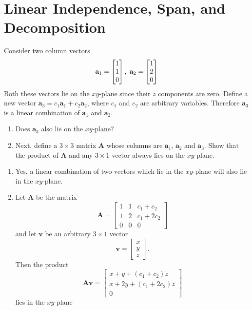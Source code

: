 

\section{Linear Independence, Span, and Decomposition}

\begin{prob}
Consider two column vectors
\begin{align}
\mathbf{a}_1 = \begin{bmatrix} 1 \\ 1 \\ 0 \end{bmatrix}, \;\mathbf{a}_2 = \begin{bmatrix} 1 \\ 2 \\ 0 \end{bmatrix}
\end{align}
Both these vectors lie on the $xy$-plane since their $z$ components are zero. Define a new vector $\mathbf{a}_3 = c_1\mathbf{a}_1 + c_2\mathbf{a}_2$, where $c_1$ and $c_2$ are arbitrary variables. Therefore $\mathbf{a}_3$ is a linear combination of $\mathbf{a}_1$ and $\mathbf{a}_2$.
\begin{enumerate}
\item Does $\mathbf{a}_3$ also lie on the $xy$-plane?
\item Next, define a $3\times 3$ matrix $\mathbf{A}$ whose columns are $\mathbf{a}_1$, $\mathbf{a}_2$ and $\mathbf{a}_3$. Show that the product of $\mathbf{A}$ and any $3\times 1$ vector always lies on the $xy$-plane.
\end{enumerate}
\end{prob}
\begin{sol}
	\begin{enumerate}
		\item Yes, a linear combination of two vectors which lie in the $xy$-plane will also lie in the $xy$-plane.
		\item Let $\mathbf{A}$ be the matrix
		$$\mathbf{A} = \begin{bmatrix} 1 & 1 & c_1+c_2 \\ 1 & 2 & c_1+2c_2 \\ 0 & 0 & 0 \end{bmatrix}$$
		and let $\mathbf{v}$ be an arbitrary $3 \times 1$ vector
		$$\mathbf{v} = \begin{bmatrix} x \\ y \\ z \end{bmatrix}.$$
		Then the product
		$$\mathbf{Av} = \begin{bmatrix} x + y + (c_1+c_2)z \\ x + 2y + (c_1+2c_2)z \\ 0 \end{bmatrix}$$
		lies in the $xy$-plane
		\end{enumerate}
\end{sol}


